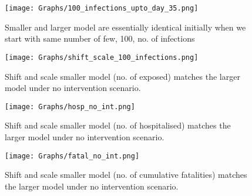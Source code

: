 \documentclass{article}
\theoremstyle{definition}
\begin{document}
 
 

  
  
  \begin{figure}
      \centering
      
 \texttt{[image: Graphs/100\_infections\_upto\_day\_35.png]}   
    \caption{Smaller and larger model are essentially identical initially when we start with same number of few, 100, no. of infections }
    \label{100_infections_upto_day_35}
  \end{figure}
 


\begin{figure}
    \centering
    \texttt{[image: Graphs/shift\_scale\_100\_infections.png]}
  \caption{Shift and scale smaller model (no. of exposed) matches the larger model under no intervention scenario. }
\label{shift_scale_100_infections}
  \end{figure}
  
  
  \begin{figure}
    \centering
    \texttt{[image: Graphs/hosp\_no\_int.png]}
  \caption{Shift and scale smaller model (no. of hospitalised) matches the larger model under no intervention scenario. }
\label{hosp_no_int}
  \end{figure}
  
  
  \begin{figure}
    \centering
    \texttt{[image: Graphs/fatal\_no\_int.png]}
  \caption{Shift and scale smaller model (no. of cumulative fatalities) matches the larger model under no intervention scenario. }
\label{fatal_no_int}
  \end{figure}
\end{document}
